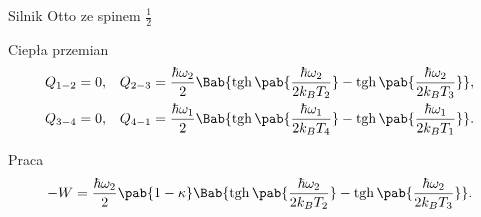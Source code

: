 \documentclass[aspectratio=1610]{beamer}
\DeclareMathOperator{\tgh}{tgh}
\newcommand{\inv}[1]{\frac{1}{#1}}
\begin{document}
\begin{frame}{Silnik Otto ze spinem \(\inv{2}\)}
	\begin{block}{Ciepła przemian}
		\begin{align*}
			Q_{1-2} &= 0, &
			Q_{2-3} &= \frac{\hbar\omega_2}{2}\Bab{\tgh\pab{\frac{\hbar\omega_2}{2 k_B T_2}} - \tgh\pab{\frac{\hbar\omega_2}{2 k_B T_3}}}, \\
			Q_{3-4} &= 0, &
			Q_{4-1} &= \frac{\hbar\omega_1}{2}\Bab{\tgh\pab{\frac{\hbar\omega_1}{2 k_B T_4}} - \tgh\pab{\frac{\hbar\omega_1}{2 k_B T_1}}}.
		\end{align*}
	\end{block}
	\begin{block}{Praca}
		\begin{equation*}
			- W = \frac{\hbar\omega_2}{2}\pab{1-\kappa}\Bab{\tgh\pab{\frac{\hbar\omega_2}{2 k_B T_2}} - \tgh\pab{\frac{\hbar\omega_2}{2 k_B T_3}}}.
		\end{equation*}
	\end{block}
\end{frame}
\end{document}
